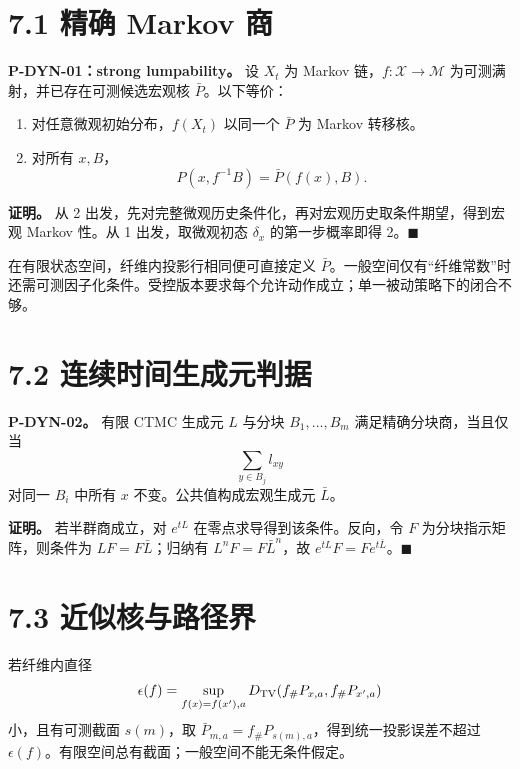 \documentclass[
  11pt,
  oneside]{book}
\providecommand{\tightlist}{%
  \setlength{\itemsep}{0pt}\setlength{\parskip}{0pt}}
\begin{document}
\section{7.1 精确 Markov 商}\label{ux7cbeux786e-markov-ux5546}

\hypertarget{p-dyn-01}{}\label{p-dyn-01}

\textbf{P-DYN-01：strong lumpability。} 设 \(X_t\) 为 Markov 链，\(f:\mathcal X\to\mathcal M\) 为可测满射，并已存在可测候选宏观核 \(\bar P\)。以下等价：

\begin{enumerate}
\def\labelenumi{\arabic{enumi}.}
\tightlist
\item
  对任意微观初始分布，\(f(X_t)\) 以同一个 \(\bar P\) 为 Markov 转移核。
\item
  对所有 \(x,B\)， \[P(x,f^{-1}B)=\bar P(f(x),B).\]
\end{enumerate}

\textbf{证明。} 从 2 出发，先对完整微观历史条件化，再对宏观历史取条件期望，得到宏观 Markov 性。从 1 出发，取微观初态 \(\delta_x\) 的第一步概率即得 2。\(\blacksquare\)

在有限状态空间，纤维内投影行相同便可直接定义 \(\bar P\)。一般空间仅有``纤维常数''时还需可测因子化条件。受控版本要求每个允许动作成立；单一被动策略下的闭合不够。

\section{7.2 连续时间生成元判据}\label{ux8fdeux7eedux65f6ux95f4ux751fux6210ux5143ux5224ux636e}

\hypertarget{p-dyn-02}{}\label{p-dyn-02}

\textbf{P-DYN-02。} 有限 CTMC 生成元 \(L\) 与分块 \(B_1,\ldots,B_m\) 满足精确分块商，当且仅当 \[\sum_{y\in B_j}l_{xy}\] 对同一 \(B_i\) 中所有 \(x\) 不变。公共值构成宏观生成元 \(\bar L\)。

\textbf{证明。} 若半群商成立，对 \(e^{tL}\) 在零点求导得到该条件。反向，令 \(F\) 为分块指示矩阵，则条件为 \(LF=F\bar L\)；归纳有 \(L^nF=F\bar L^n\)，故 \(e^{tL}F=Fe^{t\bar L}\)。\(\blacksquare\)

\section{7.3 近似核与路径界}\label{ux8fd1ux4f3cux6838ux4e0eux8defux5f84ux754c}

若纤维内直径 \[\epsilon(f)=\sup_{f(x)=f(x'),a}
D_{\rm TV}(f_\#P_{x,a},f_\#P_{x',a})\] 小，且有可测截面 \(s(m)\)，取 \(\bar P_{m,a}=f_\#P_{s(m),a}\)，得到统一投影误差不超过 \(\epsilon(f)\)。有限空间总有截面；一般空间不能无条件假定。
\end{document}
